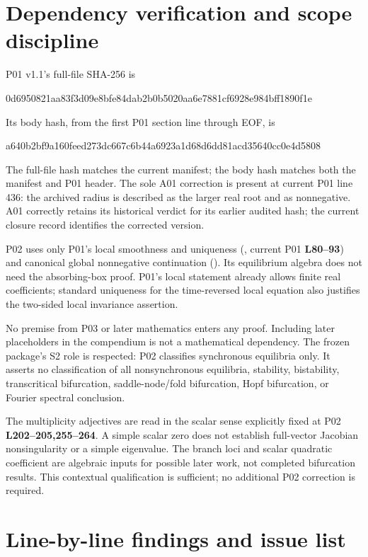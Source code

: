 \documentclass[11pt]{article}
\newcommand{\lin}[1]{\textbf{L#1}}
\newcommand{\sha}[2]{\par{\small\ttfamily #1\allowbreak #2}\par}
\begin{document}
\section{Dependency verification and scope discipline}

P01 v1.1's full-file SHA-256 is
\sha{0d6950821aa83f3d09e8bfe84dab2b0b5}{020aa6e7881cf6928e984bff1890f1e}
Its body hash, from the first P01 section line through EOF, is
\sha{a640b2bf9a160feed273dc667c6b44a692}{3a1d68d6dd81acd35640cc0e4d5808}
The full-file hash matches the current manifest; the body hash matches
both the manifest and P01 header.
The sole A01 correction is present at current P01 line 436: the
archived radius is described as the larger real root and as nonnegative.
A01 correctly retains its historical verdict for its earlier audited
hash; the current closure record identifies the corrected version.

P02 uses only P01's local smoothness and uniqueness
(, current P01 \lin{80--93}) and canonical
global nonnegative continuation ().
Its equilibrium algebra does not need the absorbing-box proof.
P01's local statement already allows finite real coefficients;
standard uniqueness for the time-reversed local equation also justifies
the two-sided local invariance assertion.

No premise from P03 or later mathematics enters any proof.
Including later placeholders in the compendium is not a mathematical
dependency. The frozen package's S2 role is respected: P02 classifies
synchronous equilibria only. It asserts no classification of all
nonsynchronous equilibria, stability, bistability, transcritical
bifurcation, saddle-node/fold bifurcation, Hopf bifurcation,
or Fourier spectral conclusion.

The multiplicity adjectives are read in the scalar sense explicitly
fixed at P02 \lin{202--205,255--264}. A simple scalar zero does
not establish full-vector Jacobian nonsingularity or a simple
eigenvalue. The branch loci and scalar quadratic coefficient are
algebraic inputs for possible later work, not completed bifurcation
results. This contextual qualification is sufficient; no additional
P02 correction is required.

\section{Line-by-line findings and issue list}
\end{document}

